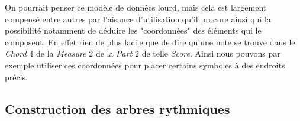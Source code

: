 \par
On pourrait penser ce modèle de données lourd, mais cela est largement compensé entre autres
par l'aisance d'utilisation qu'il procure ainsi qui la possibilité notamment de déduire les
"coordonnées" des éléments qui le composent. En effet rien de plus facile que de dire
qu'une note se trouve dans le \emph{Chord} 4 de la \emph{Measure} 2 de la \emph{Part}
2 de telle \emph{Score}. Ainsi nous pouvons par exemple utiliser ces coordonnées pour
placer certains symboles à des endroits précis.

\subsection{Construction des arbres rythmiques}

